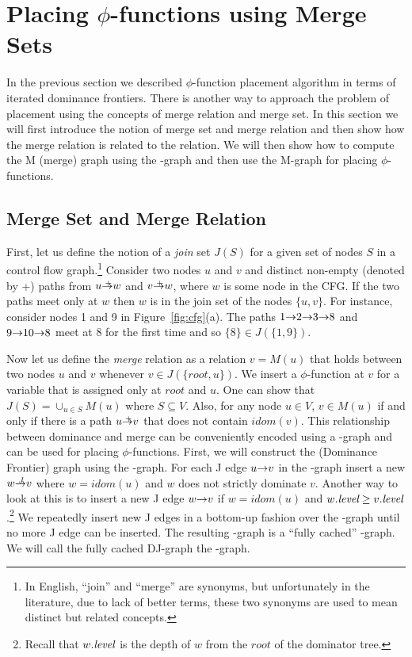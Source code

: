 {\section{Placing $\phi$-functions using Merge Sets}

In the previous section we described $\phi$-function placement algorithm in terms of iterated dominance frontiers. There is another way to approach the problem
of \phifun placement using the concepts of merge relation and merge set. In this section
we will first introduce the notion of merge set and merge relation and then show
how the merge relation is related to the \DF relation. We will then show how to compute
the M (merge) graph using the \DJ-graph and then use the M-graph for placing $\phi$-functions.

\subsection{Merge Set and Merge Relation}

First, let us define the notion of a {\em join} set $J(S)$
 for a given set of nodes  $S$ in a control flow
 graph.\footnote{In English, ``join'' and ``merge'' are synonyms, 
but unfortunately
in the literature, due to lack of  better terms, these two synonyms are used to mean
distinct but related concepts.} Consider two nodes $u$ and $v$ and distinct 
non-empty (denoted by +)
paths from $u \stplus w$ and $v \stplus w$, where $w$ is some node in the CFG. If the 
two paths meet only at $w$ then $w$ is in the join set of the nodes $\{u, v\}$. 
For instance, consider nodes 1 and 9 in Figure~\ref{fig:cfg}(a).
The paths $1 \st{} 2 \st{} 3 \st{} 8$ and $9 \st{} 10 \st{} 8$ meet at $8$ 
for the first time and so $\{8\} \in J(\{1,9\})$. 

Now let us define the {\em merge} relation as a relation 
$v=M(u)$ that holds between two nodes $u$ and $v$ whenever
$v \in J(\{\textit{root}, u\})$. We insert a $\phi$-function at $v$ for a variable that is assigned
only at $\textit{root}$ and $u$. One can show that $J(S) = \cup_{u \in S} M(u)$ where $S \subseteq V$. Also, for any node $u \in V$, $v \in M(u)$ if and only if
there is a path $u \stplus v$ that does not contain $\textit{idom}(v)$.  This relationship between
dominance and merge can be conveniently encoded using a \DJ-graph and can be used for placing 
$\phi$-functions. First, we will construct the \DF (Dominance Frontier) graph using the \DJ-graph. For each J edge $u \st{} v$ in the \DJ-graph insert a new  $w \st{J} v$ where
$w = \textit{idom} (u)$ and $w$ does not strictly dominate $v$. Another way to look at 
this is to insert a new J edge $w \st{} v$ if $w = \textit{idom}(u)$ and $w.\textit{level} \geq 
v.\textit{level}$.\footnote{Recall that $w.\textit{level}$ is the depth of $w$ from the
$\textit{root}$ of the dominator tree.} We repeatedly insert new J edges in a bottom-up fashion over the \DJ-graph until no more J edge can be inserted. The resulting \DJ-graph is a ``fully cached'' \DJ-graph. We will call the fully cached DJ-graph the \DF-graph.

}

